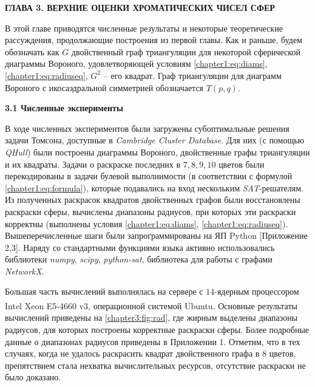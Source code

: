 \newpage
\begin{center}
\noindent\textbf{ГЛАВА 3. ВЕРХНИЕ ОЦЕНКИ ХРОМАТИЧЕСКИХ ЧИСЕЛ СФЕР}\label{chapters:3}
\vspace{1.5mm}
\end{center}

В этой главе приводятся численные результаты и некоторые теоретические рассуждения, продолжающие построения из первой главы. 
Как и раньше, будем обозначать как $G$ двойственный граф триангуляции для некоторой сферической диаграммы Вороного, 
удовлетворяющей условиям \ref{chapter1:eq:diams}, \ref{chapter1:eq:radiuseq}, $G^2$ -- его квадрат. 
Граф триангуляции для диаграмм Вороного с икосаэдральной симметрией обозначается $T(p,q)$.

\vspace{5pt}
\textbf{3.1 Численные эксперименты}\label{chapters:3.1}
\vspace{5pt}

В ходе численных экспериментов были загружены субоптимальные решения задачи Томсона, 
доступные в \textit{Cambridge Cluster Database}. 
Для них (с помощью \textit{QHull}) были построены диаграммы Вороного, двойственные графы триангуляции и их квадраты.  
Задачи о раскраске последних в $7,8,9,10$ цветов были перекодированы в задачи булевой выполнимости (в соответствии с 
формулой \ref{chapter1:eq:formula}), которые подавались на вход нескольким \textit{SAT}-решателям. 
Из полученных раскрасок квадратов двойственных графов были восстановлены раскраски сферы, вычислены диапазоны радиусов, 
при которых эти раскраски корректны (выполнены условия \ref{chapter1:eq:diams}, \ref{chapter1:eq:radiuseq}). 
Вышеперечисленные шаги были запрограммированы на ЯП Python [Приложение 2,3]. 
Наряду со стандартными функциями языка активно использовались библиотеки \textit{numpy}, \textit{scipy}, \textit{python-sat},  
библиотека для работы с графами \textit{NetworkX}.

Большая часть вычислений выполнялась на сервере с
$14$-ядерным процессором Intel\textsuperscript{\textcopyright} Xeon\textsuperscript{\textcopyright} E5-4660 v3, 
операционной системой Ubuntu. 
Основные результаты вычислений приведены на \figurename{ \ref{chapter3:fig:rad}}, где жирным выделены диапазоны радиусов, 
для которых построены корректные раскраски сферы. Более подробные данные о диапазонах радиусов приведены в Приложении 1.
Отметим, что в тех случаях, когда не удалось раскрасить квадрат двойственного графа в $8$ цветов, 
препятствием стала нехватка вычислительных ресурсов, отсутствие раскраски не было доказано.

